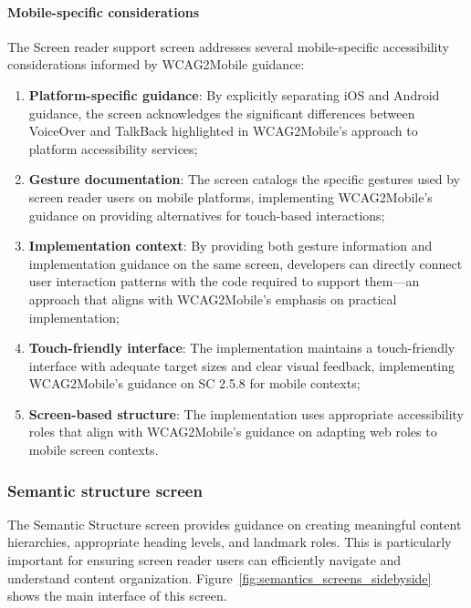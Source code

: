 \paragraph{Mobile-specific considerations}

The Screen reader support screen addresses several mobile-specific accessibility considerations informed by WCAG2Mobile guidance:

\begin{enumerate}
    \item \textbf{Platform-specific guidance}: By explicitly separating iOS and Android guidance, the screen acknowledges the significant differences between VoiceOver and TalkBack highlighted in WCAG2Mobile's approach to platform accessibility services;
    
    \item \textbf{Gesture documentation}: The screen catalogs the specific gestures used by screen reader users on mobile platforms, implementing WCAG2Mobile's guidance on providing alternatives for touch-based interactions;
    
    \item \textbf{Implementation context}: By providing both gesture information and implementation guidance on the same screen, developers can directly connect user interaction patterns with the code required to support them—an approach that aligns with WCAG2Mobile's emphasis on practical implementation;
    
    \item \textbf{Touch-friendly interface}: The implementation maintains a touch-friendly interface with adequate target sizes and clear visual feedback, implementing WCAG2Mobile's guidance on SC 2.5.8 for mobile contexts;
    
    \item \textbf{Screen-based structure}: The implementation uses appropriate accessibility roles that align with WCAG2Mobile's guidance on adapting web roles to mobile screen contexts.
\end{enumerate}

\subsubsection{Semantic structure screen}
\label{subsubsec:semantic-structure}

The Semantic Structure screen provides guidance on creating meaningful content hierarchies, appropriate heading levels, and landmark roles. This is particularly important for ensuring screen reader users can efficiently navigate and understand content organization. Figure~\ref{fig:semantics_screens_sidebyside} shows the main interface of this screen.

